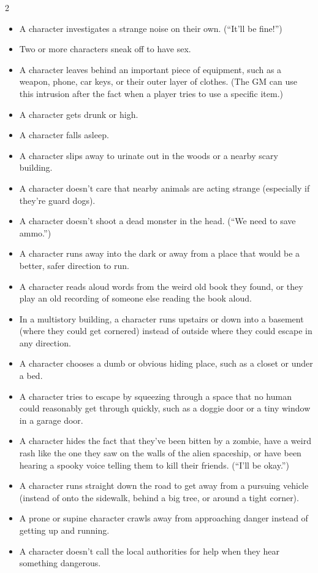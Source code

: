 \begin{multicols}{2}
\begin{itemize}
\item A character investigates a strange noise on their own. (“It’ll be fine!”)
\item Two or more characters sneak off to have sex.
\item A character leaves behind an important piece of equipment, such as a weapon, phone, car keys, or their outer layer of clothes. (The GM can use this intrusion after the fact when a player tries to use a specific item.)
\item A character gets drunk or high.
\item A character falls asleep.
\item A character slips away to urinate out in the woods or a nearby scary building.
\item A character doesn’t care that nearby animals are acting strange (especially if they’re guard dogs).
\item A character doesn’t shoot a dead monster in the head. (“We need to save ammo.”)
\item A character runs away into the dark or away from a place that would be a better, safer direction to run.
\item A character reads aloud words from the weird old book they found, or they play an old recording of someone else reading the book aloud.
\item In a multistory building, a character runs upstairs or down into a basement (where they could get cornered) instead of outside where they could escape in any direction.
\item A character chooses a dumb or obvious hiding place, such as a closet or under a bed.
\item A character tries to escape by squeezing through a space that no human could reasonably get through quickly, such as a doggie door or a tiny window in a garage door.
\item A character hides the fact that they’ve been bitten by a zombie, have a weird rash like the one they saw on the walls of the alien spaceship, or have been hearing a spooky voice telling them to kill their friends. (“I’ll be okay.”)
\item A character runs straight down the road to get away from a pursuing vehicle (instead of onto the sidewalk, behind a big tree, or around a tight corner).
\item A prone or supine character crawls away from approaching danger instead of getting up and running.
\item A character doesn’t call the local authorities for help when they hear something dangerous.

\end{itemize}
\end{multicols}
